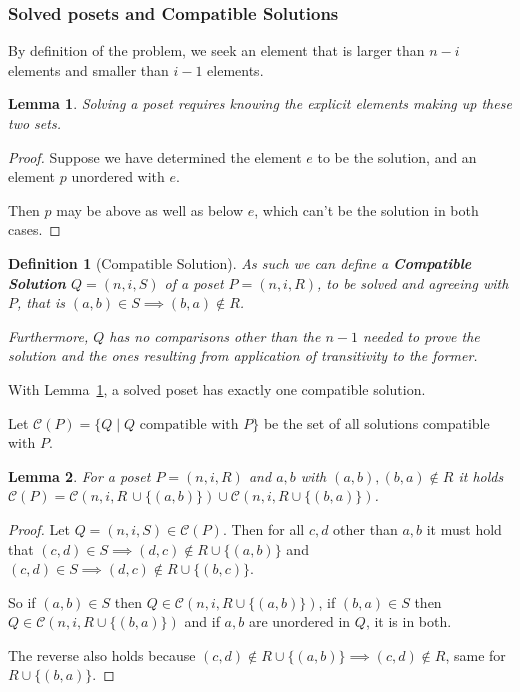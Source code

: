 \documentclass[10pt,journal,compsoc]{IEEEtran}
\newtheorem{lemma}{Lemma}
\newtheorem{definition}{Definition}
\begin{document}
\subsubsection{Solved posets and Compatible Solutions}
By definition of the problem, we seek an element that is larger than $n-i$ elements and smaller than $i - 1$ elements.

\begin{lemma}\label{lemma:partition}
  Solving a poset requires knowing the explicit elements making up these two sets.
\end{lemma}

\begin{proof}
  Suppose we have determined the element $e$ to be the solution, and an element $p$ unordered with $e$.

  Then $p$ may be above as well as below $e$, which can't be the solution in both cases.
\end{proof}

\begin{definition}[Compatible Solution]
  As such we can define a \textbf{Compatible Solution} $Q = (n, i, S)$ of a poset $P = (n, i, R)$, to be solved and agreeing with $P$, that is $(a, b)\in S\implies (b, a)\notin R$.

  Furthermore, $Q$ has no comparisons other than the $n - 1$ needed to prove the solution and the ones resulting from application of transitivity to the former.
\end{definition}

With Lemma~\ref{lemma:partition}, a solved poset has exactly one compatible solution.

Let $\mathcal{C}(P) = \{Q \mid Q \text{ compatible with } P\}$ be the set of all solutions compatible with $P$.

\begin{lemma}\label{lemma:compatible_union}
  For a poset $P = (n, i, R)$ and $a, b$ with $(a, b), (b, a)\notin R$ it holds $\mathcal{C}(P) = \mathcal{C}(n, i, R \, \cup \{(a, b)\}) \cup \mathcal{C}(n, i, R\cup \{(b, a)\})$.
\end{lemma}

\begin{proof}
  Let $Q = (n, i, S)\in \mathcal{C}(P)$.
  Then for all $c, d$ other than $a, b$ it must hold that $(c, d)\in S\implies (d,c)\notin R\cup \{(a, b)\}$ and $(c, d)\in S\implies (d, c)\notin R\cup \{(b, c)\}$.

  So if $(a, b)\in S$ then $Q\in\mathcal{C}(n, i, R\cup \{(a, b)\})$, if $(b, a)\in S$ then $Q\in\mathcal{C}(n, i, R\cup \{(b, a)\})$
  and if $a, b$ are unordered in $Q$, it is in both.

  The reverse also holds because $(c, d)\notin R\cup \{(a, b)\}\implies (c, d)\notin R$, same for $R\cup \{(b, a)\}$.
\end{proof}
\end{document}

